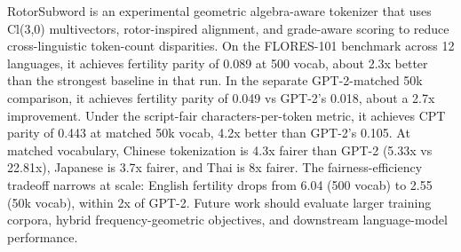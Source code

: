 \documentclass[11pt]{article}
\begin{document}
RotorSubword is an experimental geometric algebra-aware tokenizer that uses Cl(3,0) multivectors, rotor-inspired alignment, and grade-aware scoring to reduce cross-linguistic token-count disparities. On the FLORES-101 benchmark across 12 languages, it achieves fertility parity of 0.089 at 500 vocab, about 2.3x better than the strongest baseline in that run. In the separate GPT-2-matched 50k comparison, it achieves fertility parity of 0.049 vs GPT-2's 0.018, about a 2.7x improvement. Under the script-fair characters-per-token metric, it achieves CPT parity of 0.443 at matched 50k vocab, 4.2x better than GPT-2's 0.105. At matched vocabulary, Chinese tokenization is 4.3x fairer than GPT-2 (5.33x vs 22.81x), Japanese is 3.7x fairer, and Thai is 8x fairer. The fairness-efficiency tradeoff narrows at scale: English fertility drops from 6.04 (500 vocab) to 2.55 (50k vocab), within 2x of GPT-2. Future work should evaluate larger training corpora, hybrid frequency-geometric objectives, and downstream language-model performance.

\nocite{*}


\end{document}
